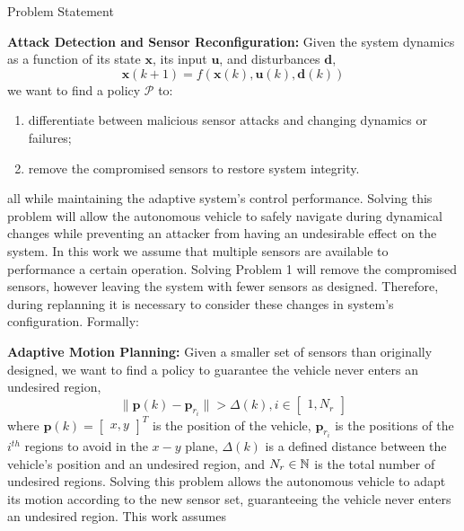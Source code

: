 \begin{section}{Problem Statement}
\begin{problem} 
\label{problem1} {\textbf{Attack Detection and Sensor Reconfiguration:}} 
 Given the system dynamics as a function of its state $ \bm{x} $, its input $ \bm{u}$, and disturbances $ \bm{d} $,
	\begin{equation}
		\bm{x}(k+1) = f(\bm{x}(k), \bm{u}(k), \bm{d}(k))
	\end{equation}
we want to find a policy $\mathcal{P}$ to:
\begin{enumerate}
	\item differentiate between malicious sensor attacks and changing dynamics or failures; 
	\item remove the compromised sensors to restore system integrity. %
\end{enumerate}
all while maintaining the adaptive system's control performance. Solving this problem will allow the autonomous vehicle to safely navigate during dynamical changes while preventing an attacker from having an undesirable effect on the system. In this work we assume that multiple sensors are available to performance a certain operation. Solving Problem 1 will remove the compromised sensors, however leaving the system with fewer sensors as designed. 
Therefore, during replanning it is necessary to consider these changes in system's configuration. Formally:
\end{problem}
	
\begin{problem} \label{problem2} {\textbf{Adaptive Motion Planning:}} 
Given a smaller set of sensors than originally designed, we want to find a policy to guarantee the vehicle never enters an undesired region,
	\begin{equation}
		\lVert {\bm{p}(k)-\bm{p}_{r_i}} \rVert >\Delta(k),  i \in \begin{bmatrix} 1,N_r \end{bmatrix}
	\end{equation}
where $\bm{p}(k)={\begin{bmatrix} x,y \end{bmatrix}}^T$ is the position of the vehicle, $\bm{p}_{r_i}$ is the positions of the ${i}^{th}$ regions to avoid in the $x-y$ plane, $\Delta(k)$ is a defined distance between the vehicle's position and an undesired region, and $N_r \in \mathbb{N}$ is the total number of undesired regions. Solving this problem allows the autonomous vehicle to adapt its motion according to the new sensor set, guaranteeing the vehicle never enters an undesired region. This work assumes



\end{problem}
\end{section}
